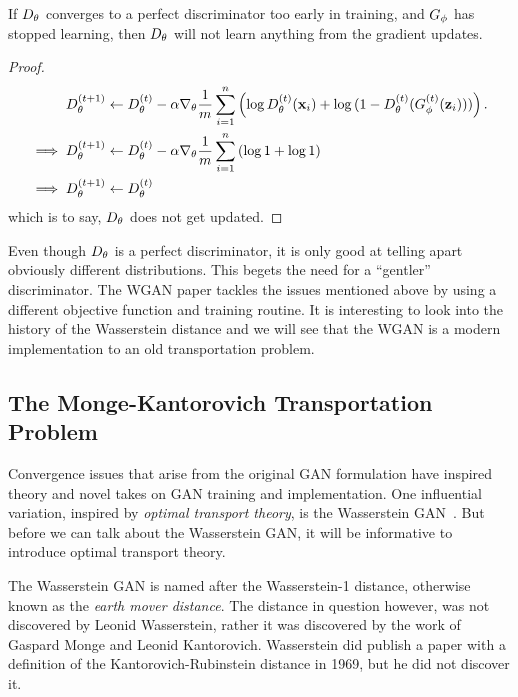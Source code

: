\begin{theorem} If $D_\theta$ converges to a perfect discriminator too early
  in training, and $G_\phi$ has stopped learning, then $D_\theta$ will not learn
  anything from the gradient updates.
\end{theorem}

\begin{proof}
  \begin{align}
    \label{eq:d-updates-no-good}
    D_\theta^{(t+1)} & \gets D_\theta^{(t)} - \alpha\nabla_\theta {1 \over m}
                 \sum_{i=1}^n \left( \log D^{(t)}_\theta(\mathbf{x}_i)
                 + \log{(1 -
                 D^{(t)}_\theta(G^{(t)}_\phi(\mathbf{z}_i)))}
                 \right). \\
    \implies D_\theta^{(t+1)} & \gets D_\theta^{(t)} - \alpha\nabla_\theta {1
                          \over m} \sum_{i=1}^n \left( \log{1} + \log{1} \right) \\
    \implies D_\theta^{(t+1)} & \gets D_\theta^{(t)}
  \end{align} which is to say, $D_\theta$ does not get updated.
\end{proof}

Even though $D_\theta$ is a perfect discriminator, it is only good at
telling apart obviously different distributions. This begets the need
for a ``gentler'' discriminator.  The WGAN paper tackles the issues
mentioned above by using a different objective function and training
routine.  It is interesting to look into the history of the
Wasserstein distance and we will see that the WGAN is a modern
implementation to an old transportation problem.

\subsection{The Monge-Kantorovich Transportation Problem}

Convergence issues that arise from the original GAN formulation have
inspired theory and novel takes on GAN training and
implementation. One influential variation, inspired by \textit{optimal
  transport theory}, is the Wasserstein
GAN~\cite{ref:arjovsky-2017}. But before we can talk about the
Wasserstein GAN, it will be informative to introduce optimal transport
theory.

The Wasserstein GAN is named after the Wasserstein-1 distance,
otherwise known as the \textit{earth mover distance}. The distance in
question however, was not discovered by Leonid Wasserstein, rather it
was discovered by the work of Gaspard Monge and Leonid
Kantorovich. Wasserstein did publish a paper with a definition of the
Kantorovich-Rubinstein distance in 1969, but he did not discover it.

